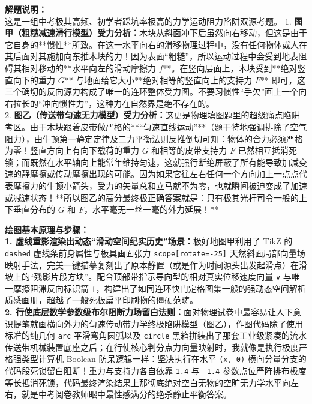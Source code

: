 {\small\color{gray}
\textbf{解题说明：}\\
这是一组中考极其高频、初学者踩坑率极高的力学运动阻力陷阱双源考题。
1. \textbf{图甲（粗糙减速滑行模型）受力分析：}木块从斜面冲下后虽然向右移动，但这是由于它自身的**惯性**所致。在这一水平向右的滑移物理过程中，没有任何物体或人在其后面对其施加向东推木块的力！因为表面“粗糙”，所以运动过程中会受到地表阻碍其相对移动的**水平向左的滑动摩擦力 $f$**。在竖向层面上，木块受到**绝对竖直向下的重力 $G$** 与地面给它大小**绝对相等的竖直向上的支持力 $F$** 即可，这三个确切的反向源力构成了唯一的连环整体受力图。不要习惯性“手欠”画上一个向右拉长的“冲向惯性力”，这种力在自然界是绝不存在的。\\
2. \textbf{图乙（传送带匀速无力模型）受力分析：}这更是物理填图题里的超级痛点陷阱考区。由于木块跟着皮带做严格的**“匀速直线运动”**（题干特地强调排除了空气阻力），由牛顿第一静定定律及二力平衡法则反推倒切可知：物体的合力必须严格为零！竖直方向上有向下载荷的重力 $G$ 和相等的皮带支持力 $F$ 已然相互抵消死锁；而既然在水平轴向上能常年维持匀速，这就强行断绝屏蔽了所有能导致加减变速的静摩擦或传动摩擦出现的可能。因为如果它往左右任何一个方向加上一点点代表摩擦力的牛顿小箭头，受力的矢量总和立马就不为零，也就瞬间被迫变成了加速或减速状态！**所以图乙的高分最终极正确答案就是：只有极其光杆司令一般的上下垂直分布的 $G$ 和 $F$，水平毫无一丝一毫的外力延展！**
}

\vspace{0.6cm}

{\small\color{blue!70!black}
\textbf{绘图基本原理与步骤：}\\
\textbf{1. 虚线重影渲染出动态“滑动空间纪实历史”场景：}极好地图甲利用了 TikZ 的 \texttt{dashed} 虚线条前身属性与极具画面张力 \texttt{scope[rotate=-25]} 天然斜面局部向量场映射手法，完美一键描摹复刻出了原本静置（或是作为时间源头出发起滑点）在滑坡上的“残影片段方块”。配合顶部带指示导向型的相对真实位移速度向量 \texttt{v} 与唯一摩擦阻滞反向标识箭 \texttt{f}，构建出了如同连环快门定格图集一般的强动态空间解析质感画册，超越了一般死板扁平印刷物的僵硬范畴。\\
\textbf{2. 行使底层数学参数级布尔阻断力场留白法则：}面对物理试卷中最容易让人下意识提笔就画横向外力的匀速传动带力学终极陷阱模型（图乙），作图代码除了使用标准的纯几何 \texttt{arc} 平滑弯角圆弧以及 \texttt{circle} 黑箱拼装出了那套工业级紧凑的流水传送带机械装置底座之后；在行使核心判分点力向量映射时，我就像是执行极度严格强类型计算机 Boolean 防呆逻辑一样：坚决执行在水平 \texttt{(x, 0)} 横向分量分支的代码段死锁留白阻断！重力与支持力各自依靠 \texttt{1.4} 与 \texttt{-1.4} 参数点位严阵排布极度等长抵消死锁，代码最终渲染结果上那彻底绝对空白无物的空旷无力学水平向左右，就是中考阅卷教师眼中最性感满分的绝杀静止平衡答案。
}

